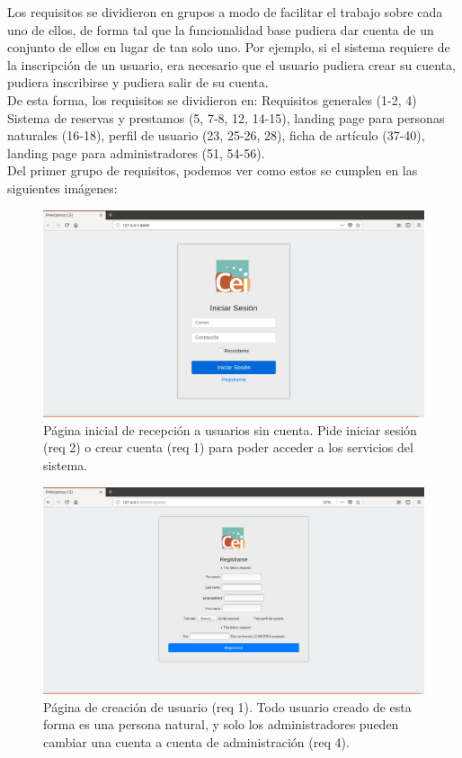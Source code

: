 Los requisitos se dividieron en grupos a modo de facilitar el trabajo sobre cada uno de ellos, de forma tal que la funcionalidad base pudiera dar cuenta de un conjunto de ellos en lugar de tan solo uno. Por ejemplo, si el sistema requiere de la inscripción de un usuario, era necesario que el usuario pudiera crear su cuenta, pudiera inscribirse y pudiera salir de su cuenta. \\
De esta forma, los requisitos se dividieron en: Requisitos generales (1-2, 4) Sistema de reservas y prestamos (5, 7-8, 12, 14-15), landing page para personas naturales (16-18), perfil de usuario (23, 25-26, 28), ficha de artículo (37-40), landing page para administradores (51, 54-56). \\
Del primer grupo de requisitos, podemos ver como estos se cumplen en las siguientes imágenes:

\begin{figure}[H]
\includegraphics[width=0.5\textheight]{images/login.png}
\caption{Página inicial de recepción a usuarios sin cuenta. Pide iniciar sesión (req 2) o crear cuenta (req 1) para poder acceder a los servicios del sistema.} \label{Login}
\end{figure}

\begin{figure}[H]
\includegraphics[width=0.5\textheight]{images/registro.png}
\caption{Página de creación de usuario (req 1). Todo usuario creado de esta forma es una persona natural, y solo los administradores pueden cambiar una cuenta a cuenta de administración (req 4).} 
\label{Registro}
\end{figure}

